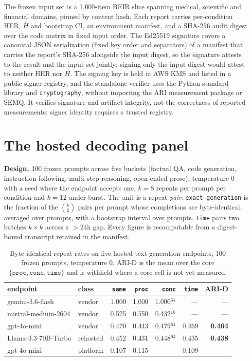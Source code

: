 \documentclass{article}
\begin{document}
The frozen input set is a 1{,}000-item BEIR slice spanning medical, scientific and financial domains, pinned by content hash. Each report carries per-condition HER, $\bar H$ and bootstrap CI, an environment manifest, and a SHA-256 audit digest over the code matrix in fixed input order. The Ed25519 signature covers a canonical JSON serialization (fixed key order and separators) of a manifest that carries the report's SHA-256 alongside the input digest, so the signature attests to the result and the input set jointly; signing only the input digest would attest to neither HER nor $\bar H$. The signing key is held in AWS KMS and listed in a public signer registry, and the standalone verifier uses the Python standard library and \texttt{cryptography}, without importing the ARI measurement package or SEMQ. It verifies signature and artifact integrity, not the correctness of reported measurements; signer identity requires a trusted registry.

\section{The hosted decoding panel}\label{app:arid}

\textbf{Design.} 100 frozen prompts across five buckets (factual QA, code generation, instruction following, multi-step reasoning, open-ended prose), temperature 0 with a seed where the endpoint accepts one, $k=8$ repeats per prompt per condition and $k=12$ under burst. The unit is a repeat \emph{pair}: \texttt{exact\_generation} is the fraction of the $\binom{k}{2}$ pairs per prompt whose completions are byte-identical, averaged over prompts, with a bootstrap interval over prompts. \texttt{time} pairs two batches $k\times k$ across a $>24$h gap. Every figure is recomputable from a digest-bound transcript retained in the manifest.

\begin{table}[h]
\centering\caption{Byte-identical repeat rates on five hosted text-generation endpoints, 100 frozen prompts, temperature 0. ARI-D is the mean over the core $\{\texttt{proc},\texttt{conc},\texttt{time}\}$ and is withheld where a core cell is not yet measured.}\label{tab:arid}\footnotesize\setlength{\tabcolsep}{4pt}
\begin{tabular}{llrrrrr}
\toprule
endpoint & class & \texttt{same} & \texttt{proc} & \texttt{conc} & \texttt{time} & \textbf{ARI-D} \\
\midrule
gemini-3.6-flash & vendor & 1.000 & 1.000 & 1.000$^{64}$ & --- & --- \\
mistral-medium-2604 & vendor & 0.525 & 0.550 & 0.432$^{16}$ & --- & --- \\
gpt-4o-mini & vendor & 0.470 & 0.443 & 0.479$^{64}$ & 0.469 & \textbf{0.464} \\
Llama-3.3-70B-Turbo & rehosted & 0.452 & 0.431 & 0.448$^{64}$ & 0.435 & \textbf{0.438} \\
gpt-4o-mini & platform & 0.107 & 0.115 & --- & 0.109 & --- \\
\bottomrule
\end{tabular}
\end{table}
\end{document}
